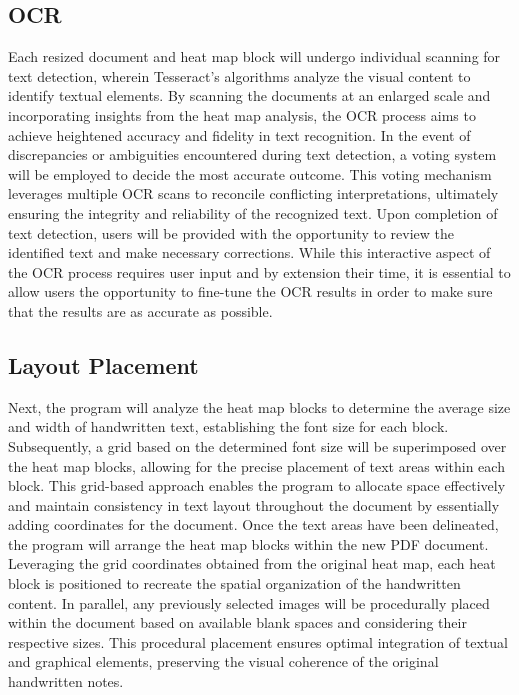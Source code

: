 \documentclass[10pt,twocolumn]{article}
\begin{document}
\subsection{OCR}
Each resized document and heat map block will undergo individual scanning for text detection, wherein Tesseract's algorithms analyze the visual content to identify textual elements. By scanning the documents at an enlarged scale and incorporating insights from the heat map analysis, the OCR process aims to achieve heightened accuracy and fidelity in text recognition. In the event of discrepancies or ambiguities encountered during text detection, a voting system will be employed to decide the most accurate outcome. This voting mechanism leverages multiple OCR scans to reconcile conflicting interpretations, ultimately ensuring the integrity and reliability of the recognized text. Upon completion of text detection, users will be provided with the opportunity to review the identified text and make necessary corrections. While this interactive aspect of the OCR process requires user input and by extension their time, it is essential to allow users the opportunity to fine-tune the OCR results in order to make sure that the results are as accurate as possible. 

\subsection{Layout Placement}
Next, the program will analyze the heat map blocks to determine the average size and width of handwritten text, establishing the font size for each block. Subsequently, a grid based on the determined font size will be superimposed over the heat map blocks, allowing for the precise placement of text areas within each block. This grid-based approach enables the program to allocate space effectively and maintain consistency in text layout throughout the document by essentially adding coordinates for the document. Once the text areas have been delineated, the program will arrange the heat map blocks within the new PDF document. Leveraging the grid coordinates obtained from the original heat map, each heat block is positioned to recreate the spatial organization of the handwritten content. In parallel, any previously selected images will be procedurally  placed within the document based on available blank spaces and considering their respective sizes. This procedural placement ensures optimal integration of textual and graphical elements, preserving the visual coherence of the original handwritten notes.
\end{document}

